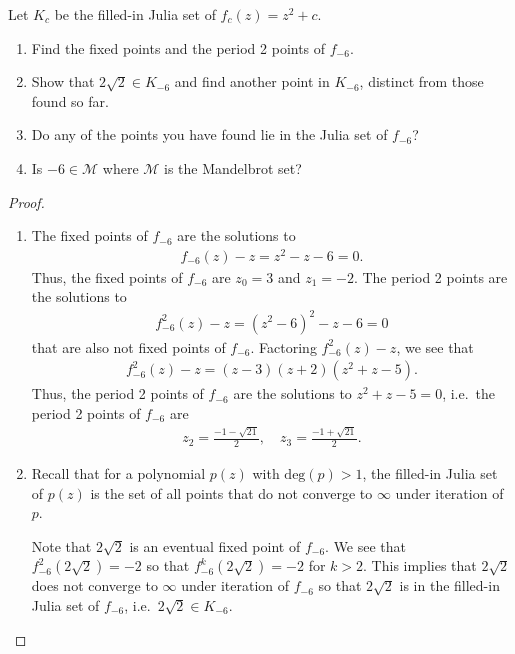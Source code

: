 \begin{problem}{2}
  Let $K_c$ be the filled-in Julia set of $f_c(z) = z^2+c$.
  \begin{enumerate}
    \item Find the fixed points and the period 2 points of $f_{-6}$.
    \item Show that $2\sqrt{2} \in K_{-6}$ and find another point in $K_{-6}$,
      distinct from those found so far.
    \item Do any of the points you have found lie in the Julia set of $f_{-6}$?
    \item Is $-6\in\mathcal{M}$ where $\mathcal{M}$ is the Mandelbrot set?
  \end{enumerate}
\end{problem}

\begin{proof}
  \begin{enumerate}
    \item The fixed points of $f_{-6}$ are the solutions to
      \begin{align*}
        f_{-6}(z) - z = z^2 - z - 6  = 0.
      \end{align*}
      Thus, the fixed points of $f_{-6}$ are $z_0 = 3$ and $z_1 = -2$.
      The period 2 points are the solutions to
      \begin{align*}
        f_{-6}^2(z) - z = (z^2 - 6)^2 - z - 6  = 0
      \end{align*}
      that are also not fixed points of $f_{-6}$. Factoring $f_{-6}^2(z) - z$, we see that
      \begin{align*}
        f_{-6}^2(z) - z = (z- 3)(z + 2)(z^2 + z - 5).
      \end{align*}
      Thus, the period 2 points of $f_{-6}$ are the solutions to $z^2 + z - 5 = 0$, i.e.\
      the period 2 points of $f_{-6}$ are
      \begin{align*}
        z_2 = \frac{-1 - \sqrt{21}}{2}, \quad z_3 = \frac{-1 + \sqrt{21}}{2}.
      \end{align*}

    \item Recall that for a polynomial $p(z)$ with $\text{deg}(p) > 1$, the filled-in Julia
      set of $p(z)$ is the set of all points that do not converge to $\infty$ under iteration of $p$.

      Note that $2\sqrt{2}$ is an eventual fixed point of $f_{-6}$. We see that
      $f^{2}_{-6}(2\sqrt{2}) = -2$ so that $f^{k}_{-6}(2\sqrt{2}) = -2$ for $k > 2$.
      This implies that $2\sqrt{2}$ does not converge to $\infty$ under iteration of
      $f_{-6}$ so that $2\sqrt{2}$ is in the filled-in Julia set of $f_{-6}$, i.e.\
      $2\sqrt{2} \in K_{-6}$.


\end{enumerate}
\end{proof}
